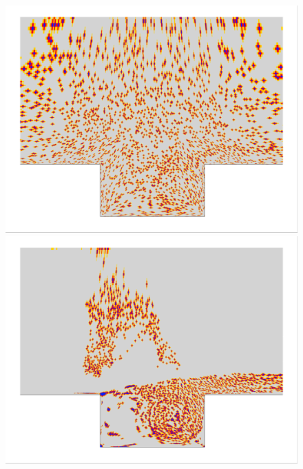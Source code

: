 \begin{figure}
	\begin{minipage}{0.49\linewidth}
		\includegraphics[width=0.99\linewidth,trim={0.5em 0.5em 0.5em 0.5em},clip]{Chapters/HPROMResults/Images/cavity/deim/iBlank_random_zoom.png}
	\end{minipage}
	\begin{minipage}{0.49\linewidth}
		\includegraphics[width=0.99\linewidth,trim={0.5em 0.5em 0.5em 0.5em},clip]{Chapters/HPROMResults/Images/cavity/deim/iBlank_eigenvec_zoom.png}
	\end{minipage}


\end{figure}
